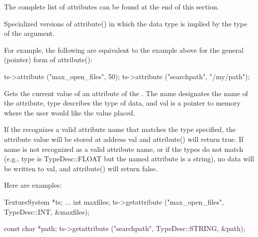The complete list of attributes can be found at the end of this section.

\apiend

Specialized versions of {\cf attribute()} in which the data type is
implied by the type of the argument.

For example, the following are equivalent to the example above for the
general (pointer) form of {\cf attribute()}:

\begin{code}
      ts->attribute ("max_open_files", 50);
      ts->attribute ("searchpath", "/my/path");
\end{code}

\apiend



Gets the current value of an attribute of the \TextureSystem.
The {\cf name} designates the name of the attribute, {\cf type}
describes the type of data, and {\cf val} is a pointer to memory 
where the user would like the value placed.

If the \TextureSystem recognizes a valid attribute name that matches the
type specified, the attribute value will be stored at address {\cf val}
and {\cf attribute()} will return {\cf true}.  If {\cf name} is not recognized
as a valid attribute name, or if the types do not match (e.g., {\cf
  type} is {\cf TypeDesc::FLOAT} but the named attribute is a string),
no data will be written to {\cf val}, and {\cf attribute()} will return
{\cf false}.

Here are examples:

\begin{code}
      TextureSystem *ts; 
      ...
      int maxfiles;
      ts->getattribute ("max_open_files", TypeDesc::INT, &maxfiles);

      const char *path;
      ts->getattribute ("searchpath", TypeDesc::STRING, &path);
\end{code}

